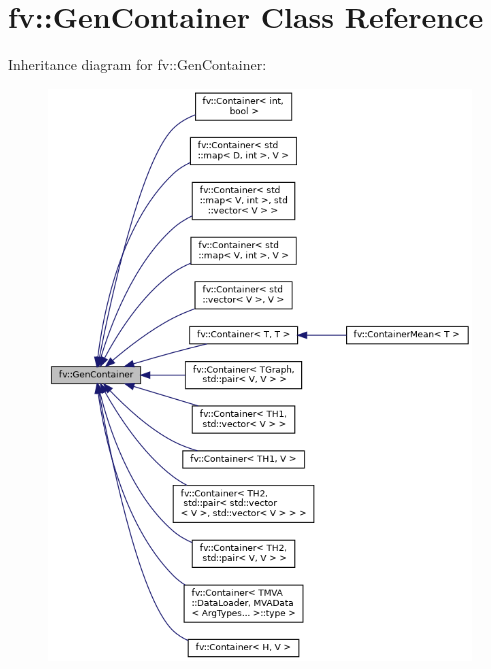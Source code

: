 \hypertarget{classfv_1_1GenContainer}{}\section{fv\+:\+:Gen\+Container Class Reference}
\label{classfv_1_1GenContainer}


Inheritance diagram for fv\+:\+:Gen\+Container\+:
\nopagebreak
\begin{figure}[H]
\begin{center}
\leavevmode
\includegraphics[width=350pt]{classfv_1_1GenContainer__inherit__graph}
\end{center}
\end{figure}
